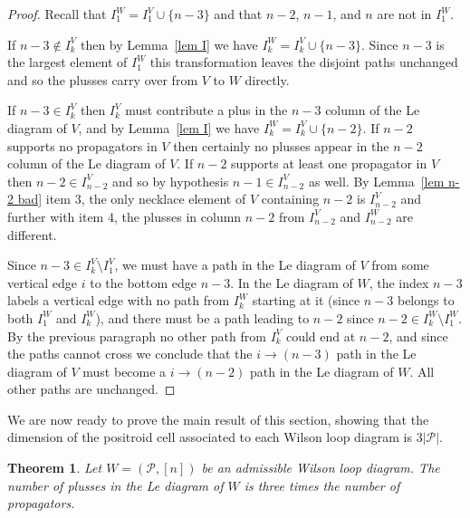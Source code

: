 \documentclass[11pt]{article}
\newcommand{\cP}{\mathcal{P}}
\newtheorem{thm}{Theorem}[section]
\theoremstyle{remark}
\theoremstyle{definition}
\begin{document}
\begin{proof}
Recall that $I_1^W = I_1^V\cup \{n-3\}$ and that $n-2$, $n-1$, and $n$ are not in $I_1^W$.

  If $n-3\not\in I_{k}^{V}$ then by Lemma~\ref{lem I} we have $I_{k}^{W} = I_k^{V}\cup \{n-3\}$.  Since $n-3$ is the largest element of $I_1^{W}$ this transformation leaves the disjoint paths unchanged and so the plusses carry over from $V$ to $W$ directly.

  If $n-3\in I_{k}^{V}$ then $I_k^V$ must contribute a plus in the $n-3$ column of the Le diagram of $V$, and by Lemma~\ref{lem I} we have $I_{k}^{W} = I_k^{V}\cup \{n-2\}$. If $n-2$ supports no propagators in $V$ then certainly no plusses appear in the $n-2$ column of the Le diagram of $V$. If $n-2$ supports at least one propagator in $V$ then $n-2 \in I_{n-2}^V$ and so by hypothesis $n-1 \in I_{n-2}^V$ as well. By Lemma~\ref{lem n-2 bad} item 3, the only necklace element of $V$ containing $n-2$ is $I_{n-2}^{V}$ and further with item 4, the plusses in column $n-2$ from $I_{n-2}^V$ and $I_{n-2}^W$ are different.

  Since $n-3 \in I_k^V \setminus I_1^V$, we must have a path in the Le diagram of $V$ from some vertical edge $i$ to the bottom edge $n-3$.  In the Le diagram of $W$, the index $n-3$ labels a vertical edge with no path from $I_k^W$ starting at it (since $n-3$ belongs to both $I_1^W$ and $I_k^W$), and there must be a path leading to $n-2$ since $n-2 \in I_k^W \setminus I_1^W$.  By the previous paragraph no other path from $I_k^V$ could end at $n-2$, and since the paths cannot cross we conclude that the $i\rightarrow (n-3)$ path in the Le diagram of $V$ must become a $i\rightarrow (n-2)$ path in the Le diagram of $W$. All other paths are unchanged.
\end{proof}

We are now ready to prove the main result of this section, showing that the dimension of the positroid cell associated to each Wilson loop diagram is $3|\cP|$. 

\begin{thm}\label{thm dim}
Let $W = (\cP, [n])$ be an admissible Wilson loop diagram.  The number of plusses in the Le diagram of $W$ is three times the number of propagators.
\end{thm}
\end{document}
